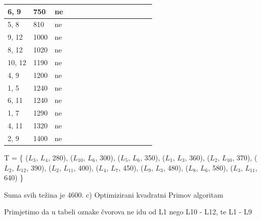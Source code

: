 \documentclass[12pt]{article}
\begin{document}
\begin{table}[hp]
\begin{tabular}{|l|l|l|l|l|l|l|l|l|l|l|l|l|l|l|}
6, 9   & 750    & ne    &      &      &      &      &      &       &      &      &      &       &       &       \\ \hline
5, 8   & 810    & ne    &      &      &      &      &      &       &      &      &      &       &       &       \\ \hline
9, 12  & 1000   & ne    &      &      &      &      &      &       &      &      &      &       &       &       \\ \hline
8, 12  & 1020   & ne    &      &      &      &      &      &       &      &      &      &       &       &       \\ \hline
10, 12 & 1190   & ne    &      &      &      &      &      &       &      &      &      &       &       &       \\ \hline
4, 9   & 1200   & ne    &      &      &      &      &      &       &      &      &      &       &       &       \\ \hline
1, 5   & 1240   & ne    &      &      &      &      &      &       &      &      &      &       &       &       \\ \hline
6, 11  & 1240   & ne    &      &      &      &      &      &       &      &      &      &       &       &       \\ \hline
1, 7   & 1290   & ne    &      &      &      &      &      &       &      &      &      &       &       &       \\ \hline
4, 11  & 1320   & ne    &      &      &      &      &      &       &      &      &      &       &       &       \\ \hline
2, 9   & 1400   & ne    &      &      &      &      &      &       &      &      &      &       &       &       \\ \hline
\end{tabular}
\end{table}
T =  \{ (\(L_{3}\), \(L_{4}\), 280), (\(L_{10}\), \(L_{6}\), 300), (\(L_{5}\), \(L_{6}\), 350), (\(L_{1}\), \(L_{3}\), 360), (\(L_{2}\), \(L_{10}\), 370), (\(L_{2}\), \(L_{12}\), 390), (\(L_{2}\), \(L_{11}\), 400), (\(L_{4}\), \(L_{7}\), 450), (\(L_{9}\), \(L_{3}\), 480), (\(L_{8}\), \(L_{6}\), 580), (\(L_{3}\), \(L_{11}\), 640) \}

Suma svih težina je 4600.
\newpage
c) Optimizirani kvadratni Primov algoritam

Primjetimo da u tabeli oznake čvorova ne idu od L1 nego L10 - L12, te L1 - L9
\end{document}
